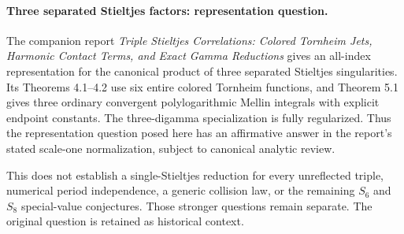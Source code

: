 \paragraph{Three separated Stieltjes factors: representation question.}
The companion report \emph{Triple Stieltjes Correlations: Colored Tornheim
Jets, Harmonic Contact Terms, and Exact Gamma Reductions} gives an
all-index representation for the canonical product of three separated
Stieltjes singularities. Its Theorems 4.1--4.2 use six entire colored
Tornheim functions, and Theorem 5.1 gives three ordinary convergent
polylogarithmic Mellin integrals with explicit endpoint constants. The
three-digamma specialization is fully regularized. Thus the representation
question posed here has an affirmative answer in the report's stated
scale-one normalization, subject to canonical analytic review.

This does not establish a single-Stieltjes reduction for every unreflected
triple, numerical period independence, a generic collision law, or the
remaining $S_6$ and $S_8$ special-value conjectures. Those stronger questions
remain separate. The original question is retained as historical context.
